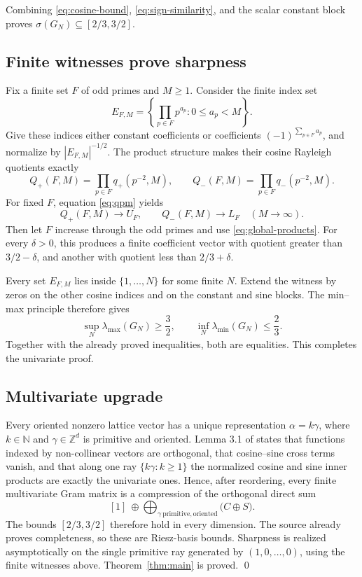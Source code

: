 \documentclass[11pt]{article}
\newcommand{\N}{\mathbb N}
\newcommand{\Z}{\mathbb Z}
\begin{document}
Combining \eqref{eq:cosine-bound}, \eqref{eq:sign-similarity}, and the scalar
constant block proves \(\sigma(G_N)\subseteq[2/3,3/2]\).

\subsection{Finite witnesses prove sharpness}

Fix a finite set \(F\) of odd primes and \(M\geq1\).  Consider the finite
index set
\[
 E_{F,M}=\left\{\prod_{p\in F}p^{a_p}:0\leq a_p<M\right\}.
\]
Give these indices either constant coefficients or coefficients
\((-1)^{\sum_{p\in F}a_p}\), and normalize by \(|E_{F,M}|^{-1/2}\).
The product structure makes their cosine Rayleigh quotients exactly
\begin{equation}\label{eq:tensor-witnesses}
 Q_+(F,M)=\prod_{p\in F}q_+(p^{-2},M),
 \qquad
 Q_-(F,M)=\prod_{p\in F}q_-(p^{-2},M).
\end{equation}
For fixed \(F\), equation \eqref{eq:qpm} yields
\[
 Q_+(F,M)\longrightarrow U_F,
 \qquad Q_-(F,M)\longrightarrow L_F
 \quad(M\to\infty).
\]
Then let \(F\) increase through the odd primes and use
\eqref{eq:global-products}.  For every \(\delta>0\), this produces a finite
coefficient vector with quotient greater than \(3/2-\delta\), and another
with quotient less than \(2/3+\delta\).

Every set \(E_{F,M}\) lies inside \(\{1,\ldots,N\}\) for some finite \(N\).
Extend the witness by zeros on the other cosine indices and on the constant
and sine blocks.  The min--max principle therefore gives
\[
 \sup_N\lambda_{\max}(G_N)\geq\frac32,
 \qquad
 \inf_N\lambda_{\min}(G_N)\leq\frac23.
\]
Together with the already proved inequalities, both are equalities.  This
completes the univariate proof.

\subsection{Multivariate upgrade}

Every oriented nonzero lattice vector has a unique representation
\(\alpha=k\gamma\), where \(k\in\N\) and \(\gamma\in\Z^d\) is primitive and
oriented.  Lemma 3.1 of \cite{SV} states that functions indexed by non-collinear
vectors are orthogonal, that cosine--sine cross terms vanish, and that along
one ray \(\{k\gamma:k\geq1\}\) the normalized cosine and sine inner products
are exactly the univariate ones.  Hence, after reordering, every finite
multivariate Gram matrix is a compression of the orthogonal direct sum
\[
 [1]\ \oplus\!
 \bigoplus_{\gamma\ \mathrm{primitive,oriented}}
 \bigl(C\oplus S\bigr).
\]
The bounds \([2/3,3/2]\) therefore hold in every dimension.  The source
already proves completeness, so these are Riesz-basis bounds.  Sharpness is
realized asymptotically on the single primitive ray generated by
\((1,0,\ldots,0)\), using the finite witnesses above.  Theorem~\ref{thm:main}
is proved. \qed
\end{document}
